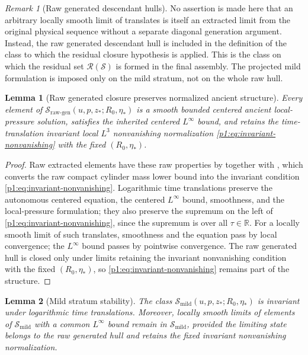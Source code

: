 \documentclass[11pt]{amsart}
\theoremstyle{plain}
\newtheorem{lemma}[lemma]{Lemma}
\theoremstyle{definition}
\theoremstyle{remark}
\newtheorem{remark}[remark]{Remark}
\numberwithin{equation}{section}
\newcommand{\R}{\mathbb R}
\newcommand{\calS}{\mathcal S}
\newcommand{\calR}{\mathcal R}
\begin{document}
\begin{remark}[Raw generated descendant hulls]
\label{p1:rem:generated-hull}
No assertion is made here that an arbitrary locally smooth limit of translates
is itself an extracted limit from the original physical sequence without a
separate diagonal generation argument.  Instead, the raw generated descendant
hull is included in the definition of the class to which the residual closure
hypothesis is applied.  This is the class on which the residual set
\(\calR(\calS)\) is formed in the final assembly.  The projected mild
formulation is imposed only on the mild stratum, not on the whole raw hull.
\end{remark}

\begin{lemma}[Raw generated closure preserves normalized ancient structure]
\label{p1:lem:raw-generated-closure-stability}
Every element of
\(\calS_{\mathrm{raw\text{-}gen}}(u,p,z_*;R_0,\eta_*)\) is a smooth bounded
centered ancient local-pressure solution, satisfies the inherited centered
\(L^\infty\) bound, and
retains the time-translation invariant local \(L^3\) nonvanishing
normalization \eqref{p1:eq:invariant-nonvanishing} with the fixed
\((R_0,\eta_*)\).
\end{lemma}

\begin{proof}
Raw extracted elements have these raw properties by
 together with
, which converts the raw compact
cylinder mass lower bound into the invariant condition
\eqref{p1:eq:invariant-nonvanishing}.  Logarithmic time translations
preserve the autonomous centered equation, the centered
\(L^\infty\) bound, smoothness, and the local-pressure formulation; they also
preserve the supremum on the left of
\eqref{p1:eq:invariant-nonvanishing}, since the supremum is over all
\(\tau\in\R\).  For a locally smooth limit of such translates, smoothness
and the equation pass by local convergence; the \(L^\infty\) bound passes
by pointwise convergence.  The raw generated hull is closed only under limits
retaining the invariant nonvanishing condition with the fixed \((R_0,\eta_*)\),
so \eqref{p1:eq:invariant-nonvanishing} remains part of the structure.
\end{proof}

\begin{lemma}[Mild stratum stability]
\label{p1:lem:mild-stratum-stability}
The class \(\calS_{\mathrm{mild}}(u,p,z_*;R_0,\eta_*)\) is invariant under
logarithmic time translations.  Moreover, locally smooth limits of elements of
\(\calS_{\mathrm{mild}}\) with a common \(L^\infty\) bound remain in
\(\calS_{\mathrm{mild}}\), provided the limiting state belongs to the raw
generated hull and retains the fixed invariant nonvanishing normalization.
\end{lemma}
\end{document}

